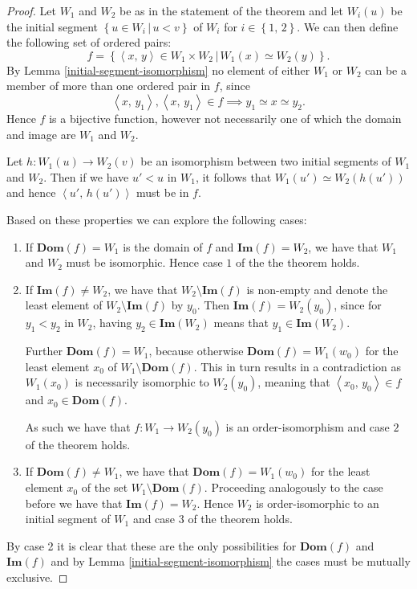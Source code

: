 \documentclass[../../main.tex]{subfiles}
\begin{document}
\begin{proof}
    Let $W_1$ and $W_2$ be as in the statement of the theorem and let $W_i(u)$ be the initial segment $\left\{u \in W_i \,\vert\, u < v\right\}$ of $W_i$ for $i \in \left\{1,\, 2\right\}$.
    We can then define the following set of ordered pairs:
    $$f = \left\{\left<x,\, y\right> \in W_1 \times W_2 \,\vert\, W_1(x) \simeq W_2(y)\right\}.$$
    By Lemma \ref{initial-segment-isomorphism} no element of either $W_1$ or $W_2$ can be a member of more than one ordered pair in $f$,
    since $$\left<x,\, y_1\right>, \left<x,\, y_1\right> \in f \implies y_1 \simeq x \simeq y_2.$$
    Hence $f$ is a bijective function, however not necessarily one of which the domain and image are $W_1$ and $W_2$.
    
    Let $h: W_1(u) \to W_2(v)$ be an isomorphism between two initial segments of $W_1$ and $W_2$.
    Then if we have $u' < u$ in $W_1$, it follows that $W_1(u') \simeq W_2(h(u'))$ and hence $\left<u',\, h(u')\right>$ must be in $f$.

    Based on these properties we can explore the following cases:
    \begin{enumerate}
        \item If $\mathbf{Dom}(f) = W_1$ is the domain of $f$ and $\mathbf{Im}(f) = W_2$, we have that $W_1$ and $W_2$ must be isomorphic.
        Hence case $1$ of the the theorem holds.
        \item If $\mathbf{Im}(f) \neq W_2$, we have that $W_2 \setminus \mathbf{Im}(f)$ is non-empty and denote the least element of $W_2 \setminus \mathbf{Im}(f)$ by $y_0$.
        Then $\mathbf{Im}(f) = W_2(y_0)$, since for $y_1 < y_2$ in $W_2$, having $y_2 \in \mathbf{Im}(W_2)$ means that $y_1 \in \mathbf{Im}(W_2)$.

        Further $\mathbf{Dom}(f) = W_1$, because otherwise $\mathbf{Dom}(f) = W_1(w_0)$ for the least element $x_0$ of $W_1 \setminus \mathbf{Dom}(f)$.
        This in turn results in a contradiction as $W_1(x_0)$ is necessarily isomorphic to $W_2(y_0)$, meaning that $\left<x_0,\, y_0\right> \in f$ and $x_0 \in \mathbf{Dom}(f)$.

        As such we have that $f: W_1 \to W_2(y_0)$ is an order-isomorphism and case $2$ of the theorem holds.
        \item If $\mathbf{Dom}(f) \neq W_1$, we have that $\mathbf{Dom}(f) = W_1(w_0)$ for the least element $x_0$ of the set $W_1 \setminus \mathbf{Dom}(f)$.
        Proceeding analogously to the case before we have that $\mathbf{Im}(f) = W_2$. 
        Hence $W_2$ is order-isomorphic to an initial segment of $W_1$ and case $3$ of the theorem holds.
    \end{enumerate}
    By case 2 it is clear that these are the only possibilities for $\mathbf{Dom}(f)$ and $\mathbf{Im}(f)$ and by Lemma \ref{initial-segment-isomorphism} the cases must be mutually exclusive.
\end{proof}
\end{document}

